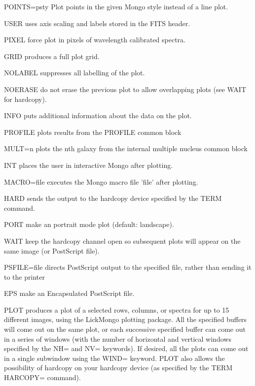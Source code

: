 \begin{command}
  \item[POINTS=psty]{Plot points in the given Mongo style instead of a line
                     plot.}
  \item[USER]{uses axis scaling and labels stored in the FITS header.}
  \item[PIXEL]{force plot in pixels of wavelength calibrated spectra.}
  \item[GRID]{produces a full plot grid.}
  \item[NOLABEL]{suppresses all labelling of the plot.}
  \item[NOERASE]{do not erase the previous plot to allow overlapping
       plots (see WAIT for hardcopy).}
  \item[INFO]{puts additional information about the data on the plot.}
  \item[PROFILE ]{plots results from the PROFILE common block}
  \item[MULT=n ]{plots the nth galaxy from the internal multiple
        nucleus common block}
  \item[INT]{places the user in interactive Mongo after plotting.}
  \item[MACRO=file ]{executes the Mongo macro file 'file' after plotting.}
  \item[HARD]{sends the output to the hardcopy device specified by
       the TERM command.}
  \item[PORT]{make an portrait mode plot (default: landscape).}
  \item[WAIT]{keep the hardcopy channel open so subsequent plots will
              appear on the same image (or PostScript file).}
  \item[PSFILE=file]{directs PostScript output to the specified file,
       rather than sending it to the printer}
  \item[EPS]{make an Encapsulated PostScript file.}
\end{command}

PLOT produces a plot of a selected rows, columns, or spectra for up to 15
different images, using the LickMongo plotting package. All the specified
buffers will come out on the same plot, or each successive specified buffer
can come out in a series of windows (with the number of horizontal and
vertical windows specified by the NH= and NV= keywords). If desired, all
the plots can come out in a single subwindow using the WIND= keyword.
PLOT also allows the possibility of hardcopy on your hardcopy device
(as specified by the TERM HARCOPY= command).


